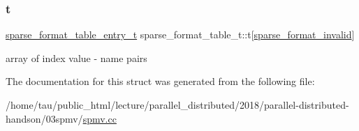 \subsubsection{\texorpdfstring{t}{t}}
{\footnotesize\ttfamily \hyperlink{structsparse__format__table__entry__t}{sparse\+\_\+format\+\_\+table\+\_\+entry\+\_\+t} sparse\+\_\+format\+\_\+table\+\_\+t\+::t\mbox{[}\hyperlink{spmv_8cc_a8c0094893526c01b430903b2d9227256adc326179d0d559f82edc8cd35be11de5}{sparse\+\_\+format\+\_\+invalid}\mbox{]}}

array of index value -\/ name pairs 

The documentation for this struct was generated from the following file\+:\begin{DoxyCompactItemize}
\item 
/home/tau/public\+\_\+html/lecture/parallel\+\_\+distributed/2018/parallel-\/distributed-\/handson/03spmv/\hyperlink{spmv_8cc}{spmv.\+cc}\end{DoxyCompactItemize}
